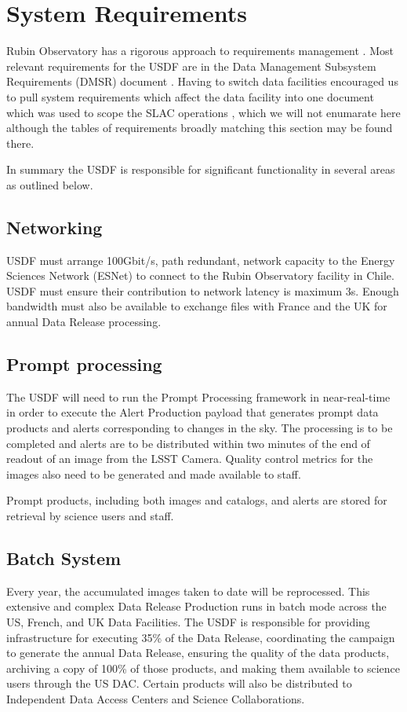 \section{System Requirements} \label{sec:requirements}

Rubin Observatory has a rigorous approach to requirements management \cite{2016SPIE.9911E..0DS}.
Most relevant requirements for the USDF are in the Data Management Subsystem Requirements (DMSR) document \cite{LSE-61}.
Having to switch data facilities encouraged us to pull system requirements which affect the data facility into one document
which was used to scope the SLAC operations \cite{rtn-080}, which we will not enumarate here although the tables of requirements broadly matching this section may be found there.

In summary the USDF is responsible for significant functionality in several areas as outlined below.


\subsection{Networking } \label{sec:networking}

USDF must arrange 100Gbit/s, path redundant, network capacity to the Energy Sciences Network (ESNet) to connect to the Rubin Observatory facility in Chile.
USDF must ensure their contribution to network latency is maximum 3s.
Enough bandwidth must also be available to exchange files with France and the UK for annual Data Release processing.

\subsection{Prompt processing} \label{sec:prompproc}
The USDF will need to run the Prompt Processing framework in near-real-time in order to execute the Alert Production payload that generates prompt data products and alerts corresponding to changes in the sky.
The processing is to be completed and alerts are to be distributed within two minutes of the end of readout of an image from the LSST Camera.
Quality control metrics for the images also need to be generated and made available to staff.

Prompt products, including both images and catalogs, and alerts are stored for retrieval by science users and staff.

\subsection{Batch System} \label{sec:offlineprod}
Every year, the accumulated images taken to date will be reprocessed.
This extensive and complex Data Release Production runs in batch mode across the US, French, and UK Data Facilities.
The USDF is responsible for providing infrastructure for executing 35\% of the Data Release, coordinating the campaign to generate the annual Data Release, ensuring the quality of the data products, archiving a copy of 100\% of those products, and making them available to science users through the US DAC.
Certain products will also be distributed to Independent Data Access Centers and Science Collaborations.\cite{RTN-003}

